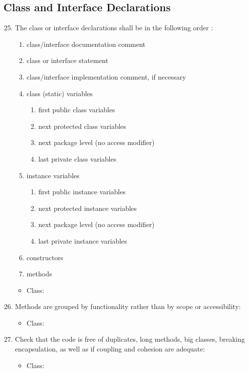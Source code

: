 \subsection{Class and Interface Declarations}
\begin{enumerate}
	\setcounter{enumi}{24}
	\item The class or interface declarations shall be in the following order :
	\begin{enumerate}[label=\Alph*.]
		\item class/interface documentation comment
		\item class or interface statement
		\item class/interface implementation comment, if necessary
		\item class (static) variables
		\begin{enumerate}[label=\alph*.]
			\item first public class variables
			\item next protected class variables
			\item next package level (no access modifier)
			\item last private class variables
		\end{enumerate}
		\item instance variables
		\begin{enumerate}[label=\alph*.]
			\item first public instance variables
			\item next protected instance variables
			\item next package level (no access modifier)
			\item last private instance variables
		\end{enumerate}
		\item constructors
		\item methods
	\end{enumerate}
	\begin{itemize}
		\item Class: \cmark
	\end{itemize}
	\item Methods are grouped by functionality rather than by scope or accessibility:
	\begin{itemize}
		\item Class: \cmark
	\end{itemize}
	\item Check that the code is free of duplicates, long methods, big classes, breaking encapsulation, as well as if coupling and cohesion are adequate:
	\begin{itemize}
		\item Class: \cmark
	\end{itemize}
\end{enumerate}